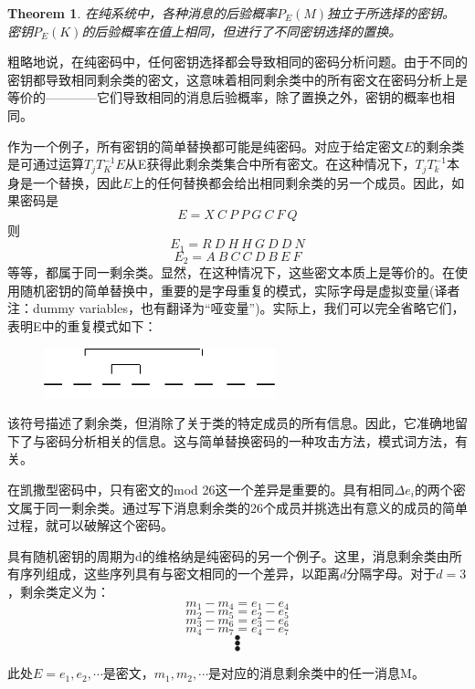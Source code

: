 \documentclass[]{article}
\newtheorem{theorem}{Theorem}
\begin{document}
\begin{theorem}
	在纯系统中，各种消息的后验概率$P_E(M)$独立于所选择的密钥。密钥$P_E(K)$的后验概率在值上相同，但进行了不同密钥选择的置换。
\end{theorem}

粗略地说，在纯密码中，任何密钥选择都会导致相同的密码分析问题。由于不同的密钥都导致相同剩余类的密文，这意味着相同剩余类中的所有密文在密码分析上是等价的————它们导致相同的消息后验概率，除了置换之外，密钥的概率也相同。

作为一个例子，所有密钥的简单替换都可能是纯密码。对应于给定密文$E$的剩余类是可通过运算$T_jT^{-1}_K E$从E获得此剩余类集合中所有密文。在这种情况下，$T_jT^{-1}_k$本身是一个替换，因此$E$上的任何替换都会给出相同剩余类的另一个成员。因此，如果密码是
\[E=X\ C\ P\ P\ G\ C\ F\ Q\]
则
\[E_1=R\ D\ H\ H\ G\ D\ D\ N \]
\[E_2=A\ B\ C\ C\ D\ B\ E\ F \]
等等，都属于同一剩余类。显然，在这种情况下，这些密文本质上是等价的。在使用随机密钥的简单替换中，重要的是字母重复的模式，实际字母是虚拟变量(译者注：dummy variables，也有翻译为“哑变量”)。实际上，我们可以完全省略它们，表明E中的重复模式如下：

\begin{figure}[htbp]
	\centering
	\includegraphics[width=0.6\textwidth]{pattern.png}
\end{figure}

该符号描述了剩余类，但消除了关于类的特定成员的所有信息。因此，它准确地留下了与密码分析相关的信息。这与简单替换密码的一种攻击方法，模式词方法，有关。

在凯撒型密码中，只有密文的mod 26这一个差异是重要的。具有相同$\Delta e_i$的两个密文属于同一剩余类。通过写下消息剩余类的26个成员并挑选出有意义的成员的简单过程，就可以破解这个密码。

具有随机密钥的周期为d的维格纳是纯密码的另一个例子。这里，消息剩余类由所有序列组成，这些序列具有与密文相同的一个差异，以距离$d$分隔字母。对于$d=3$，剩余类定义为：
\[m_1-m_4=e_1-e_4\]
\[m_2-m_5=e_2-e_5\]
\[m_3-m_6=e_3-e_6\]
\[m_4-m_7=e_4-e_7\]
\[\bullet\]
\[\bullet\]
\[\bullet\]

此处$E=e_1,e_2,\cdots$是密文，$m_1,m_2,\cdots$是对应的消息剩余类中的任一消息M。
\end{document}

